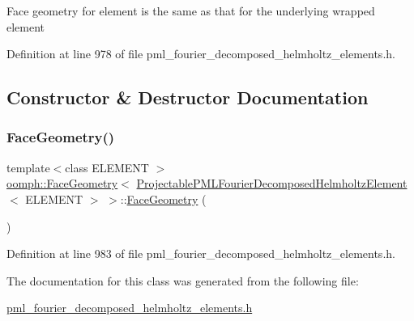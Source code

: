Face geometry for element is the same as that for the underlying wrapped element 

Definition at line 978 of file pml\+\_\+fourier\+\_\+decomposed\+\_\+helmholtz\+\_\+elements.\+h.



\subsection{Constructor \& Destructor Documentation}
\mbox{\label{classoomph_1_1FaceGeometry_3_01ProjectablePMLFourierDecomposedHelmholtzElement_3_01ELEMENT_01_4_01_4_ab5bbae7155c15824b21af53e68523bfe}} 
\subsubsection{\texorpdfstring{Face\+Geometry()}{FaceGeometry()}}
{\footnotesize\ttfamily template$<$class E\+L\+E\+M\+E\+NT $>$ \\
\hyperlink{classoomph_1_1FaceGeometry}{oomph\+::\+Face\+Geometry}$<$ \hyperlink{classoomph_1_1ProjectablePMLFourierDecomposedHelmholtzElement}{Projectable\+P\+M\+L\+Fourier\+Decomposed\+Helmholtz\+Element}$<$ E\+L\+E\+M\+E\+NT $>$ $>$\+::\hyperlink{classoomph_1_1FaceGeometry}{Face\+Geometry} (\begin{DoxyParamCaption}{ }\end{DoxyParamCaption})\hspace{0.3cm}{\ttfamily [inline]}}



Definition at line 983 of file pml\+\_\+fourier\+\_\+decomposed\+\_\+helmholtz\+\_\+elements.\+h.



The documentation for this class was generated from the following file\+:\begin{DoxyCompactItemize}
\item 
\hyperlink{pml__fourier__decomposed__helmholtz__elements_8h}{pml\+\_\+fourier\+\_\+decomposed\+\_\+helmholtz\+\_\+elements.\+h}\end{DoxyCompactItemize}
